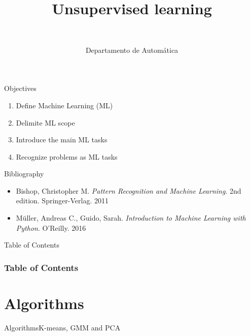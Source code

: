 \documentclass[10pt,compress]{beamer} %
\title[Unsupervised learning]{Unsupervised learning}
\author{\asignatura\\\carrera}
\institute{}
\date{Departamento de Automática}
\begin{document}
{\titlepageBlue
    \begin{frame}
        \titlepage
    \end{frame}
}

\institute{\asignatura}

\begin{frame}[plain]{}
   \begin{block}{Objectives}
      \begin{enumerate}
         \item Define Machine Learning (ML)
		 \item Delimite ML scope
         \item Introduce the main ML tasks
         \item Recognize problems as ML tasks
      \end{enumerate} 
   \end{block}

   \begin{block}{Bibliography}
	\begin{itemize}
        \item Bishop, Christopher M. \textit{Pattern Recognition and Machine Learning}. 2nd edition. Springer-Verlag. 2011
        \item M\"uller, Andreas C., Guido, Sarah. \textit{Introduction to Machine Learning with Python}. O'Reilly. 2016
	\end{itemize}
   \end{block}
\end{frame}

{
\begin{frame}[shrink]{Table of Contents}

 	\frametitle{Table of Contents}
  	\begin{multicols}{2}
  		\tableofcontents
    \end{multicols}

\end{frame}
}

\section{Algorithms}
{
\sectionheaderWhite %
\begin{frame}{Algorithms}{K-means, GMM and PCA}
\end{frame}
}
\end{document}
